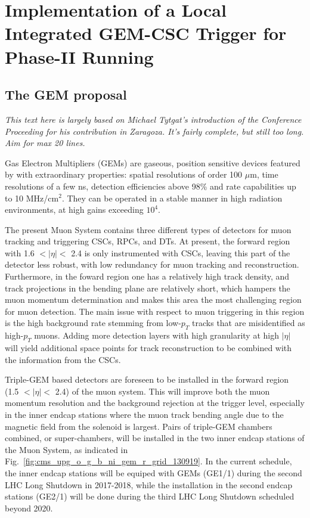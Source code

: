 \section{Implementation of a Local Integrated GEM-CSC Trigger for Phase-II Running}
\label{sec:slhc_algorithm_with_gems}

\subsection{The GEM proposal}

\textit{This text here is largely based on Michael Tytgat's introduction of the Conference Proceeding for his contribution in Zaragoza. It's fairly complete, but still too long. Aim for max 20 lines.}

Gas Electron Multipliers (GEMs) are gaseous, position sensitive devices featured by with extraordinary properties: spatial resolutions of order 100 $\mu$m, time resolutions of a few ns, detection efficiencies above 98\% and rate capabilities up to 10 MHz/cm$^2$. They can be operated in a stable manner in high radiation environments, at high gains exceeding $10^4$. %

The present Muon System contains three different types of detectors for muon tracking and triggering CSCs, RPCs, and DTs. At present, the forward region with 1.6 $<|\eta|<$ 2.4 is only instrumented with CSCs, leaving this part of the detector less robust, with low redundancy for muon tracking and reconstruction. Furthermore, in the foward region one has a relatively high track density, and track projections in the bending plane are relatively short, which hampers the muon momentum determination and makes this area the most challenging region for muon detection. The main issue with respect to muon triggering in this region is the high background rate stemming from low-$p_T$ tracks that are misidentified as high-$p_T$ muons. Adding more detection layers with high granularity at high $|\eta|$ will yield additional space points for track reconstruction to be combined with the information from the CSCs. 

Triple-GEM based detectors are foreseen to be installed in the forward region (1.5 $<|\eta|<$ 2.4) of the muon system. This will improve both the muon momentum resolution and the background rejection at the trigger level, especially in the inner endcap stations where the muon track bending angle due to the magnetic field from the solenoid is largest. Pairs of triple-GEM chambers combined, or super-chambers, will be installed in the two inner endcap stations of the Muon System, as indicated in Fig.~\ref{fig:cms_upg_o_g_b_ni_gem_r_grid_130919}. In the current schedule, the inner endcap stations will be equiped with GEMs (GE1/1) during the second LHC Long Shutdown in 2017-2018, while the installation in the second endcap stations (GE2/1) will be done during the third LHC Long Shutdown scheduled beyond 2020. 

